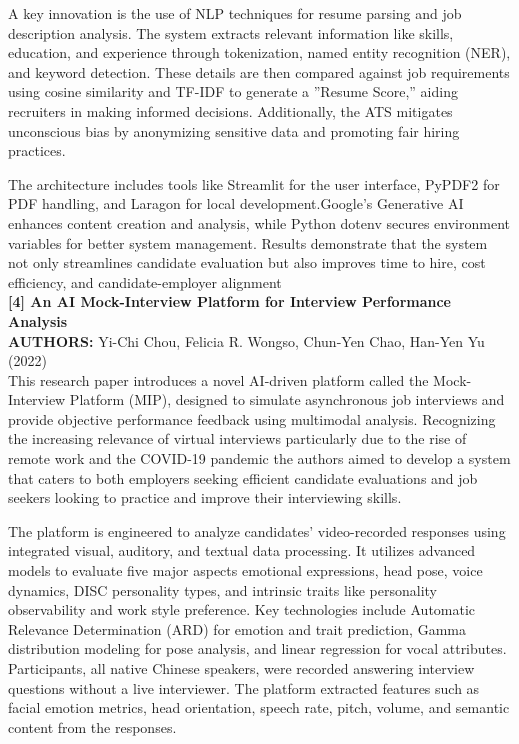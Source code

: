 \documentclass[a4paper, 12pt]{report}
\begin{document}
A key innovation is the use of NLP techniques for resume parsing and job description analysis. The system extracts relevant information like skills, education, and experience through tokenization, named entity recognition (NER), and keyword detection. These details are then compared against job requirements using cosine similarity and TF-IDF to generate a ”Resume Score,” aiding recruiters in making informed decisions. Additionally, the ATS mitigates unconscious bias by anonymizing sensitive data and promoting fair hiring practices.

The architecture includes tools like Streamlit for the user interface, PyPDF2 for PDF handling, and Laragon for local development.Google’s Generative AI enhances content creation and analysis, while Python dotenv secures environment variables for better system management. Results demonstrate that the system not only streamlines candidate evaluation but also improves time to hire, cost efficiency, and candidate-employer alignment\\
\noindent\textbf{[4] An AI Mock-Interview Platform for Interview Performance Analysis}\\
\textbf{AUTHORS:} Yi-Chi Chou, Felicia R. Wongso, Chun-Yen Chao, Han-Yen Yu (2022)\\
This research paper introduces a novel AI-driven platform called the Mock-Interview Platform (MIP), designed to simulate asynchronous job interviews and provide objective performance feedback using multimodal analysis. Recognizing the increasing relevance of virtual interviews particularly due to the rise of remote work and the COVID-19 pandemic the authors aimed to develop a system that caters to both employers seeking efficient candidate evaluations and job seekers looking to practice and improve their interviewing skills.

The platform is engineered to analyze candidates’ video-recorded responses using integrated visual, auditory, and textual data processing. It utilizes advanced models to evaluate five major aspects emotional expressions, head pose, voice dynamics, DISC personality types, and intrinsic traits like personality observability and work style preference. Key technologies include Automatic Relevance Determination (ARD) for emotion and trait prediction, Gamma distribution modeling for pose analysis, and linear regression for vocal attributes.
Participants, all native Chinese speakers, were recorded answering interview questions without a live interviewer. The platform extracted features such as facial emotion metrics, head orientation, speech rate, pitch, volume, and semantic content from the responses.
 
\end{document}

